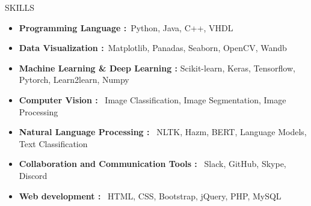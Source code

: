 \documentclass[]{CV}
\begin{document}
\vspace{-6mm}
\begin{section}{SKILLS}
    \begin{itemize}
        \item \textbf{Programming Language :}~Python, Java, C++, VHDL
        \item \textbf{Data Visualization :}~Matplotlib, Panadas, Seaborn, OpenCV, Wandb
        \item \textbf{Machine Learning \& Deep Learning :} Scikit-learn, Keras, Tensorflow, Pytorch, Learn2learn, Numpy
        \item \textbf{Computer Vision :}~ Image Classification, Image Segmentation, Image Processing
        \item \textbf{Natural Language Processing :}~ NLTK, Hazm, BERT, Language Models, Text Classification
        \item \textbf{Collaboration and Communication Tools : }~Slack, GitHub, Skype, Discord
	\item \textbf{Web development :}~ HTML, CSS, Bootstrap, jQuery, PHP,  MySQL
    \end{itemize} 
\end{section}
\end{document}
